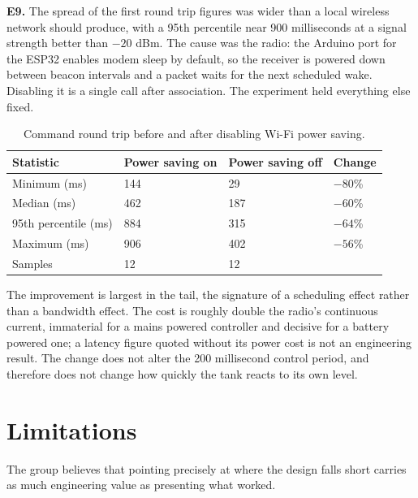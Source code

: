 \textbf{E9.} The spread of the first round trip figures was wider than a local wireless network should produce, with a 95th percentile near 900 milliseconds at a signal strength better than $-20$ dBm. The cause was the radio: the Arduino port for the ESP32 enables modem sleep by default, so the receiver is powered down between beacon intervals and a packet waits for the next scheduled wake. Disabling it is a single call after association. The experiment held everything else fixed.

\begin{table}[H]
\caption{Command round trip before and after disabling Wi-Fi power saving.}
\label{tab:e9}
\centering
\renewcommand{\arraystretch}{1.05}
\begin{tabular}{|p{5.0cm}|p{2.6cm}|p{2.6cm}|p{2.0cm}|}
\hline
\textbf{Statistic} & \textbf{Power saving on} & \textbf{Power saving off} & \textbf{Change} \\
\hline
Minimum (ms)          & 144 & 29  & $-80$\% \\ \hline
Median (ms)           & 462 & 187 & $-60$\% \\ \hline
95th percentile (ms)  & 884 & 315 & $-64$\% \\ \hline
Maximum (ms)          & 906 & 402 & $-56$\% \\ \hline
Samples               & 12  & 12  & \\ \hline
\end{tabular}
\end{table}

The improvement is largest in the tail, the signature of a scheduling effect rather than a bandwidth effect. The cost is roughly double the radio's continuous current, immaterial for a mains powered controller and decisive for a battery powered one; a latency figure quoted without its power cost is not an engineering result. The change does not alter the 200 millisecond control period, and therefore does not change how quickly the tank reacts to its own level.

\section{Limitations}
\label{sec:o8-7}

The group believes that pointing precisely at where the design falls short carries as much engineering value as presenting what worked.

